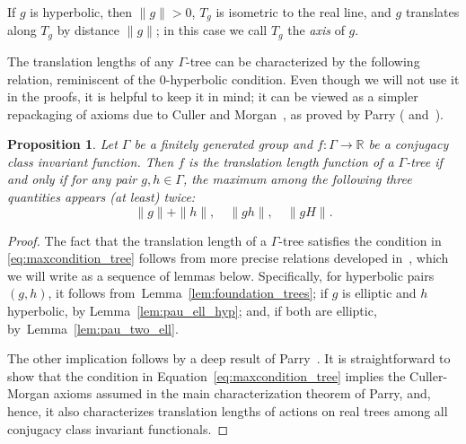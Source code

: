 \documentclass[11pt]{amsart}
\numberwithin{equation}{section}
\numberwithin{figure}{section}
\newtheorem{proposition}[theorem]{Proposition}
\theoremstyle{definition}
\theoremstyle{plain}
\begin{document}
If $g$ is hyperbolic, then $\| g \| >0$, $T_g$ is isometric to the
real line, and $g$ translates along $T_g$ by distance $\| g\|$; in this
case we call $T_g$ the \emph{axis} of $g$.

The translation lengths of any $\Gamma$-tree can be characterized by the following relation, reminiscent of the $0$-hyperbolic condition.
Even though we will not use it in the proofs, it is helpful to keep it in mind;
it can be viewed as a simpler repackaging of axioms due to Culler and
Morgan~\cite[Section~1.11]{CM87:GroupActions}, as proved by Parry (\cite[Equation~(0.2)]{Par91:Translation} and~\cite[Main Theorem]{Par91:Translation}).

\begin{proposition}
\label{prop:max_twice}
Let $\Gamma$ be a finitely generated group and $f \colon \Gamma \to \mathbb{R}$ be a conjugacy class invariant function.
Then $f$ is the translation length function of
a $\Gamma$-tree if and only if for any pair $g,h \in \Gamma$, the maximum among the following three quantities appears (at least) twice:
\begin{equation}
\|g\|+\|h\|, \quad \|gh\|, \quad \|gH\|.
\label{eq:maxcondition_tree}
\end{equation}
\end{proposition}
\begin{proof}
The fact that the translation length of a $\Gamma$-tree
satisfies the condition in \eqref{eq:maxcondition_tree} follows from
more precise relations developed
in~\cite{CM87:GroupActions,Pa89:Paulin1989TheGT}, which we will write
as a sequence of lemmas below. Specifically, for hyperbolic pairs
$(g,h)$, it follows from~Lemma~\ref{lem:foundation_trees}; if $g$ is
elliptic and $h$ hyperbolic, by Lemma~\ref{lem:pau_ell_hyp}; and, if
both are elliptic, by~Lemma~\ref{lem:pau_two_ell}.

The other implication follows by a deep result of Parry~\cite{Par91:Translation}. It is straightforward to show that the condition in Equation~\eqref{eq:maxcondition_tree} implies the Culler-Morgan axioms assumed in the main characterization theorem of Parry, and, hence, it also
characterizes translation lengths of actions on real trees among all conjugacy class invariant functionals.
\end{proof}
\end{document}
